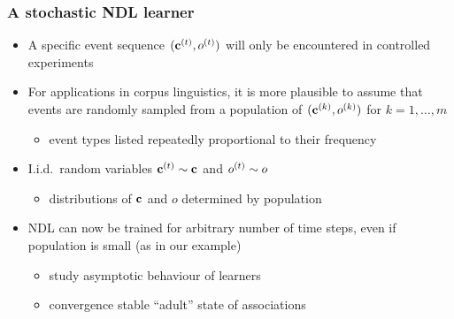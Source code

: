\begin{frame}[c]
\end{frame}

\begin{frame}
  \frametitle{A stochastic NDL learner}

  \begin{itemize}
  \item<1-> A specific event sequence $(\vc[t], o\psupt)$ will only be encountered in controlled experiments
  \item<2-> For applications in corpus linguistics, it is more plausible to assume that events are randomly sampled from a population of  $(\vc[k], o\psup{k})$ for $k = 1, \ldots, m$
    \begin{itemize}
    \item[\hand] event types listed repeatedly proportional to their frequency
    \end{itemize}
  \item<3-> I.i.d.\ random variables $\vc[t] \sim \vc$ and $o^{(t)}\sim o$
    \begin{itemize}
    \item[\hand] distributions of $\vc$ and $o$ determined by population
    \end{itemize}
  \item<3-> NDL can now be trained for arbitrary number of time steps, even if population is small (as in our example)
    \begin{itemize}
    \item study asymptotic behaviour of learners
    \item convergence \so stable ``adult'' state of associations
    \end{itemize}
  \end{itemize}
\end{frame}

